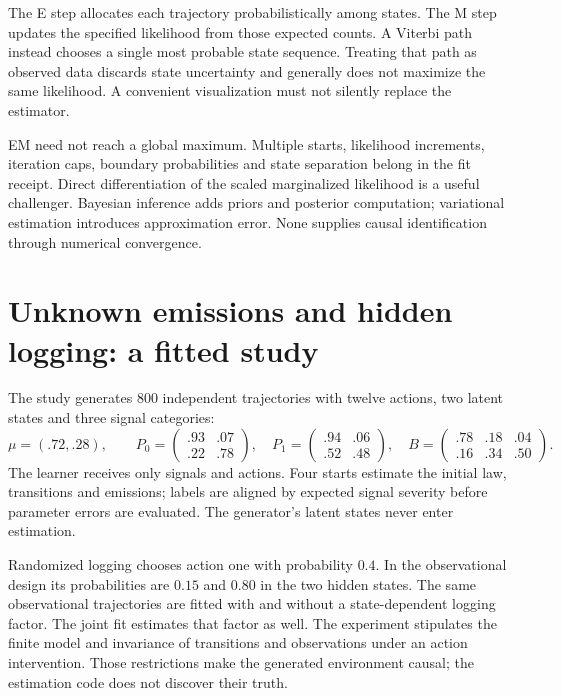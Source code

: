 The E step allocates each trajectory probabilistically among states.
The M step updates the specified likelihood from those expected counts.
A Viterbi path instead chooses a single most probable state sequence.
Treating that path as observed data discards state uncertainty and generally
does not maximize the same likelihood. A convenient visualization must
not silently replace the estimator.

EM need not reach a global maximum. Multiple starts, likelihood increments,
iteration caps, boundary probabilities and state separation belong in
the fit receipt. Direct differentiation of the scaled marginalized
likelihood is a useful challenger. Bayesian inference adds priors and
posterior computation; variational estimation introduces approximation
error. None supplies causal identification through numerical convergence.

\section{Unknown emissions and hidden logging: a fitted study}
The study generates 800 independent trajectories with twelve actions,
two latent states and three signal categories:
\[
 \mu=(.72,.28),\qquad
 P_0=\begin{pmatrix}.93&.07\\.22&.78\end{pmatrix},\quad
 P_1=\begin{pmatrix}.94&.06\\.52&.48\end{pmatrix},\quad
 B=\begin{pmatrix}.78&.18&.04\\.16&.34&.50\end{pmatrix}.
\]
The learner receives only signals and actions. Four starts estimate the
initial law, transitions and emissions; labels are aligned by expected
signal severity before parameter errors are evaluated. The generator's
latent states never enter estimation.

Randomized logging chooses action one with probability $0.4$. In the
observational design its probabilities are $0.15$ and $0.80$ in the two
hidden states. The same observational trajectories are fitted with and
without a state-dependent logging factor. The joint fit estimates that
factor as well. The experiment stipulates the finite model and invariance
of transitions and observations under an action intervention. Those
restrictions make the generated environment causal; the estimation code
does not discover their truth.


